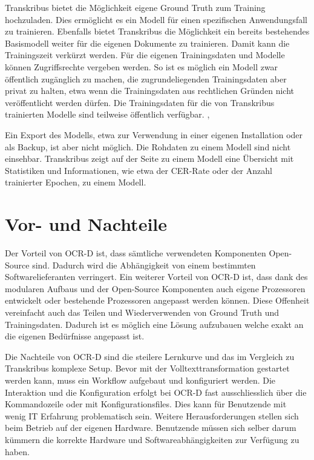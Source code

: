 \documentclass[a4paper,oneside, 12pt]{report}
\begin{document}
Transkribus bietet die Möglichkeit eigene Ground Truth zum Training hochzuladen. Dies ermöglicht es ein Modell für einen spezifischen Anwendungsfall zu trainieren. Ebenfalls bietet Transkribus die Möglichkeit ein bereits bestehendes Basismodell weiter für die eigenen Dokumente zu trainieren. Damit kann die Trainingszeit verkürzt werden. Für die eigenen Trainingsdaten und Modelle können Zugriffsrechte vergeben werden. So ist es möglich ein Modell zwar öffentlich zugänglich zu machen, die zugrundeliegenden Trainingsdaten aber privat zu halten, etwa wenn die Trainingsdaten aus rechtlichen Gründen nicht veröffentlicht werden dürfen. Die Trainingsdaten für die von Transkribus trainierten Modelle sind teilweise öffentlich verfügbar. \cite{diem_markus_2017_1491441}, \cite{transkribusmodels}

Ein Export des Modells, etwa zur Verwendung in einer eigenen Installation oder als Backup, ist aber nicht möglich. Die Rohdaten zu einem Modell sind nicht einsehbar. Transkribus zeigt auf der Seite zu einem Modell eine Übersicht mit Statistiken und Informationen, wie etwa der CER-Rate oder der Anzahl trainierter Epochen, zu einem Modell. \cite{transkribusmodels}


\section{Vor- und Nachteile}
Der Vorteil von OCR-D ist, dass sämtliche verwendeten Komponenten Open-Source sind. Dadurch wird die Abhängigkeit von einem bestimmten Softwarelieferanten verringert. Ein weiterer Vorteil von OCR-D ist, dass dank des modularen Aufbaus und der Open-Source Komponenten auch eigene Prozessoren entwickelt oder bestehende Prozessoren angepasst werden können. Diese Offenheit vereinfacht auch das Teilen und Wiederverwenden von Ground Truth und Trainingsdaten. Dadurch ist es möglich eine Lösung aufzubauen welche exakt an die eigenen Bedürfnisse angepasst ist.

Die Nachteile von OCR-D sind die steilere Lernkurve und das im Vergleich zu Transkribus komplexe Setup. Bevor mit der Volltexttransformation gestartet werden kann, muss ein Workflow aufgebaut und konfiguriert werden. Die Interaktion und die Konfiguration erfolgt bei OCR-D fast ausschliesslich über die Kommandozeile oder mit Konfigurationsfiles. Dies kann für Benutzende mit wenig IT Erfahrung problematisch sein. Weitere Herausforderungen stellen sich beim Betrieb auf der eigenen Hardware. Benutzende müssen sich selber darum kümmern die korrekte Hardware und Softwareabhängigkeiten zur Verfügung zu haben.
\end{document}
